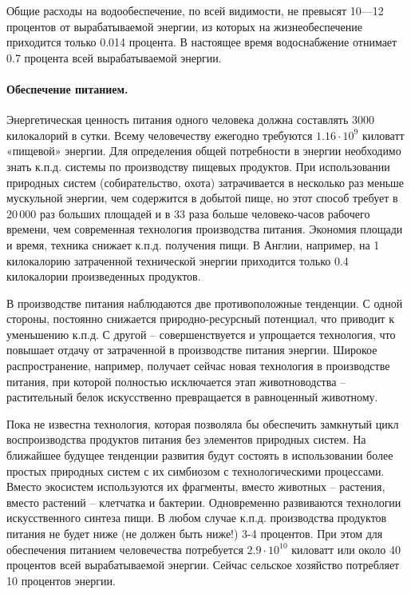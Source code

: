 \documentclass[11pt,a4paper]{article}
\begin{document}
Общие расходы на водообеспечение, по всей видимости, не превысят 10—12
процентов от вырабатываемой энергии, из которых на жизнеобеспечение приходится
только 0.014 процента. В настоящее время водоснабжение отнимает 0.7 процента
всей вырабатываемой энергии.

\paragraph{Обеспечение питанием.}
Энергетическая ценность питания одного человека должна составлять 3000
килокалорий в сутки. Всему человечеству ежегодно требуются $1.16\cdot 10^9$
киловатт «пищевой» энергии. Для определения общей потребности в энергии
необходимо знать к.п.д. системы по производству пищевых продуктов. При
использовании природных систем (собирательство, охота) затрачивается в
несколько раз меньше мускульной энергии, чем содержится в добытой пище, но
этот способ требует в 20\,000 раз больших площадей и в 33 раза больше
человеко-часов рабочего времени, чем современная технология производства
питания. Экономия площади и время, техника снижает к.п.д. получения пищи. В
Англии, например, на 1 килокалорию затраченной технической энергии приходится
только 0.4 килокалории произведенных продуктов.

В производстве питания наблюдаются две противоположные тенденции. С одной
стороны, постоянно снижается природно-ресурсный потенциал, что приводит к
уменьшению к.п.д. С другой -- совершенствуется и упрощается технология, что
повышает отдачу от затраченной в производстве питания энергии. Широкое
распространение, например, получает сейчас новая технология в производстве
питания, при которой полностью исключается этап животноводства -- растительный
белок искусственно превращается в равноценный животному.

Пока не известна технология, которая позволяла бы обеспечить замкнутый цикл
воспроизводства продуктов питания без элементов природных систем. На ближайшее
будущее тенденции развития будут состоять в использовании более простых
природных систем с их симбиозом с технологическими процессами. Вместо
экосистем используются их фрагменты, вместо животных -- растения, вместо
растений -- клетчатка и бактерии. Одновременно развиваются технологии
искусственного синтеза пищи. В любом случае к.п.д. производства продуктов
питания не будет ниже (не должен быть ниже!) 3-4 процентов. При этом для
обеспечения питанием человечества потребуется $2.9\cdot 10^{10}$ киловатт или
около 40 процентов всей вырабатываемой энергии. Сейчас сельское хозяйство
потребляет 10 процентов энергии.
\end{document}
